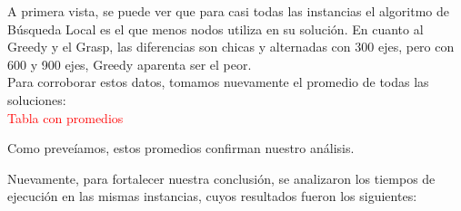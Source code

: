 A primera vista, se puede ver que para casi todas las instancias el algoritmo de B\'usqueda Local es el que menos nodos utiliza en su soluci\'on. 
En cuanto al Greedy y el Grasp, las diferencias son chicas y alternadas con 300 ejes, pero con 600 y 900 ejes, Greedy aparenta ser el peor.\\

Para corroborar estos datos, tomamos nuevamente el promedio de todas las soluciones:\\

\textcolor{red}{Tabla con promedios}

Como preve\'iamos, estos promedios confirman nuestro an\'alisis.

Nuevamente, para fortalecer nuestra conclusión, se analizaron los tiempos de ejecución en las mismas instancias, cuyos resultados fueron los siguientes:

